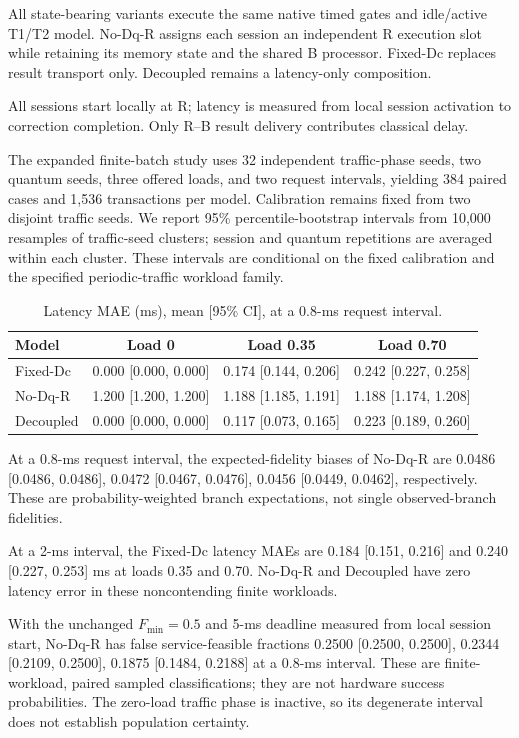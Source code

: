 All state-bearing variants execute the same native timed gates and idle/active T1/T2 model. No-Dq-R assigns each session an independent R execution slot while retaining its memory state and the shared B processor. Fixed-Dc replaces result transport only. Decoupled remains a latency-only composition.

All sessions start locally at R; latency is measured from local session activation to correction completion. Only R--B result delivery contributes classical delay.

The expanded finite-batch study uses 32 independent traffic-phase seeds,
two quantum seeds, three offered loads, and two request intervals, yielding
384 paired cases and 1,536 transactions per model. Calibration remains
fixed from two disjoint traffic seeds. We report 95\% percentile-bootstrap
intervals from 10,000 resamples of traffic-seed clusters; session and quantum
repetitions are averaged within each cluster. These intervals are conditional
on the fixed calibration and the specified periodic-traffic workload family.

\begin{table}[t]
\centering
\caption{Latency MAE (ms), mean [95\% CI], at a 0.8-ms request interval.}
\begin{tabular}{lccc}
\hline
Model & Load 0 & Load 0.35 & Load 0.70 \\
\hline
Fixed-Dc & 0.000 [0.000, 0.000] & 0.174 [0.144, 0.206] & 0.242 [0.227, 0.258] \\
No-Dq-R & 1.200 [1.200, 1.200] & 1.188 [1.185, 1.191] & 1.188 [1.174, 1.208] \\
Decoupled & 0.000 [0.000, 0.000] & 0.117 [0.073, 0.165] & 0.223 [0.189, 0.260] \\
\hline
\end{tabular}
\end{table}

At a 0.8-ms request interval, the expected-fidelity biases of No-Dq-R are 0.0486 [0.0486, 0.0486], 0.0472 [0.0467, 0.0476], 0.0456 [0.0449, 0.0462], respectively. These are probability-weighted branch expectations, not single observed-branch fidelities.

At a 2-ms interval, the Fixed-Dc latency MAEs are 0.184 [0.151, 0.216] and 0.240 [0.227, 0.253] ms at loads 0.35 and 0.70. No-Dq-R and Decoupled have zero latency error in these noncontending finite workloads.

With the unchanged $F_{\min}=0.5$ and 5-ms deadline measured from local session start, No-Dq-R has false service-feasible fractions 0.2500 [0.2500, 0.2500], 0.2344 [0.2109, 0.2500], 0.1875 [0.1484, 0.2188] at a 0.8-ms interval. These are finite-workload, paired sampled classifications; they are not hardware success probabilities. The zero-load traffic phase is inactive, so its degenerate interval does not establish population certainty.

